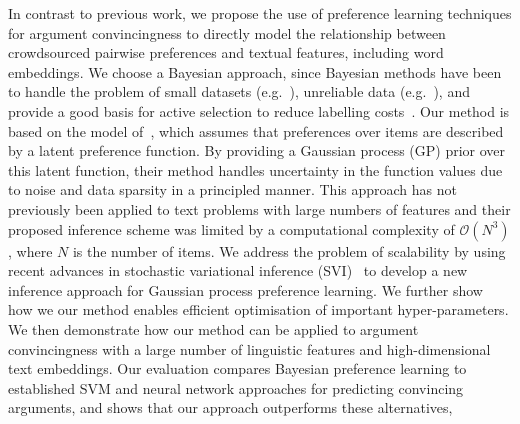 In contrast to previous work, we propose the use of preference learning techniques for argument convincingness
to directly model the relationship between crowdsourced pairwise preferences and textual features, 
including word embeddings.
We choose a Bayesian approach, since Bayesian methods have been 
to handle the problem of small datasets (e.g.~\cite{xiong2011bayesian,titov2012bayesian}), 
unreliable data (e.g.~\cite{simpson2015language}),
and provide a good basis for active selection to reduce labelling costs~\cite{mackay1992information}.
Our method is based on the model of~\cite{chu2005preference},
which assumes that preferences over items are described by a latent preference function.
By providing a Gaussian process (GP) prior over this latent function, 
their method handles uncertainty in the function values due to noise and data sparsity in a principled manner.
This approach has not previously been applied to text problems with large
numbers of features and their proposed inference scheme was limited 
by a computational complexity of $\mathcal{O}(N^3)$, where $N$ is the number of items.
We address the problem of scalability by using recent advances in stochastic variational
inference (SVI)~\cite{hoffman2013stochastic} to develop a new inference approach for Gaussian process preference learning. 
We further show how we our method enables efficient optimisation of important hyper-parameters.
We then demonstrate how our method can be applied to argument convincingness 
with a large number of linguistic features and high-dimensional text embeddings.
Our evaluation compares Bayesian preference learning to established SVM and neural network approaches for predicting convincing arguments, and shows that our approach outperforms these alternatives, 
